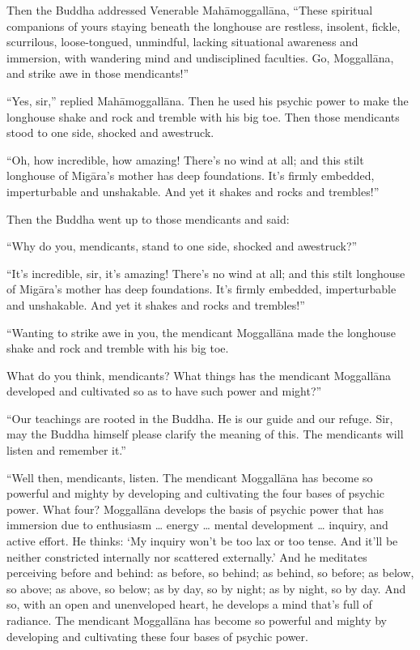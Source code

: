 \documentclass[12pt,openany]{book}%
\begin{document}
Then the Buddha addressed Venerable \textsanskrit{Mahāmoggallāna}, “These spiritual companions of yours staying beneath the longhouse are restless, insolent, fickle, scurrilous, loose-tongued, unmindful, lacking situational awareness and immersion, with wandering mind and undisciplined faculties. Go, \textsanskrit{Moggallāna}, and strike awe in those mendicants!” 

“Yes, sir,” replied \textsanskrit{Mahāmoggallāna}. Then he used his psychic power to make the longhouse shake and rock and tremble with his big toe. Then those mendicants stood to one side, shocked and awestruck. 

“Oh, how incredible, how amazing! There’s no wind at all; and this stilt longhouse of \textsanskrit{Migāra}’s mother has deep foundations. It’s firmly embedded, imperturbable and unshakable. And yet it shakes and rocks and trembles!” 

Then the Buddha went up to those mendicants and said: 

“Why do you, mendicants, stand to one side, shocked and awestruck?” 

“It’s incredible, sir, it’s amazing! There’s no wind at all; and this stilt longhouse of \textsanskrit{Migāra}’s mother has deep foundations. It’s firmly embedded, imperturbable and unshakable. And yet it shakes and rocks and trembles!” 

“Wanting to strike awe in you, the mendicant \textsanskrit{Moggallāna} made the longhouse shake and rock and tremble with his big toe. 

What do you think, mendicants? What things has the mendicant \textsanskrit{Moggallāna} developed and cultivated so as to have such power and might?” 

“Our teachings are rooted in the Buddha. He is our guide and our refuge. Sir, may the Buddha himself please clarify the meaning of this. The mendicants will listen and remember it.” 

“Well then, mendicants, listen. The mendicant \textsanskrit{Moggallāna} has become so powerful and mighty by developing and cultivating the four bases of psychic power. What four? \textsanskrit{Moggallāna} develops the basis of psychic power that has immersion due to enthusiasm … energy … mental development … inquiry, and active effort. He thinks: ‘My inquiry won’t be too lax or too tense. And it’ll be neither constricted internally nor scattered externally.’ And he meditates perceiving before and behind: as before, so behind; as behind, so before; as below, so above; as above, so below; as by day, so by night; as by night, so by day. And so, with an open and unenveloped heart, he develops a mind that’s full of radiance. The mendicant \textsanskrit{Moggallāna} has become so powerful and mighty by developing and cultivating these four bases of psychic power. 
\end{document}

